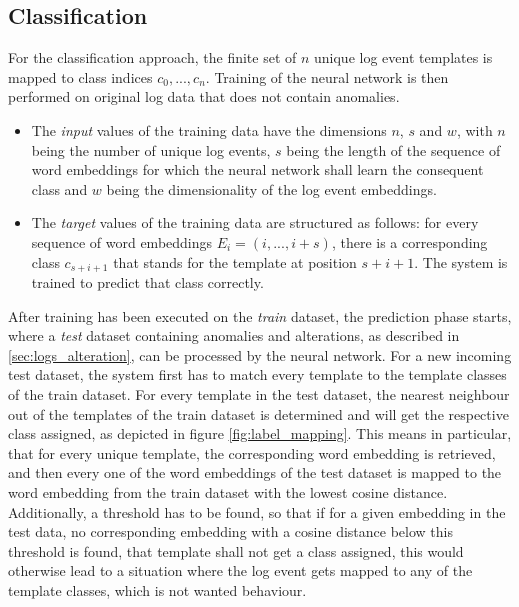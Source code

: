 \subsection{Classification \label{sec:classification}}
For the classification approach, the finite set of $n$ unique log event templates is mapped to class indices $c_0, ..., c_n$. Training of the neural network is then performed on original log data that does not contain anomalies.
\begin{itemize}
\setlength\itemsep{-0.5em}
	\item The \textit{input} values of the training data have the dimensions $n$, $s$ and $w$, with $n$ being the number of unique log events, $s$ being the length of the sequence of word embeddings for which the neural network shall learn the consequent class and $w$ being the dimensionality of the log event embeddings.
	\item The \textit{target} values of the training data are structured as follows: for every sequence of word embeddings $E_i = (i, ..., i+s)$, there is a corresponding class $c_{s+i+1}$ that stands for the template at position $s+i+1$. The system is trained to predict that class correctly.
\end{itemize}

After training has been executed on the \textit{train} dataset, the prediction phase starts, where a \textit{test} dataset containing anomalies and alterations, as described in \ref{sec:logs_alteration}, can be processed by the neural network. For a new incoming test dataset, the system first has to match every template to the template classes of the train dataset. For every template in the test dataset, the nearest neighbour out of the templates of the train dataset is determined and will get the respective class assigned, as depicted in figure \ref{fig:label_mapping}. This means in particular, that for every unique template, the corresponding word embedding is retrieved, and then every one of the word embeddings of the test dataset is mapped to the word embedding from the train dataset with the lowest cosine distance. Additionally, a threshold has to be found, so that if for a given embedding in the test data, no corresponding embedding with a cosine distance below this threshold is found, that template shall not get a class assigned, this would otherwise lead to a situation where the log event gets mapped to any of the template classes, which is not wanted behaviour.

